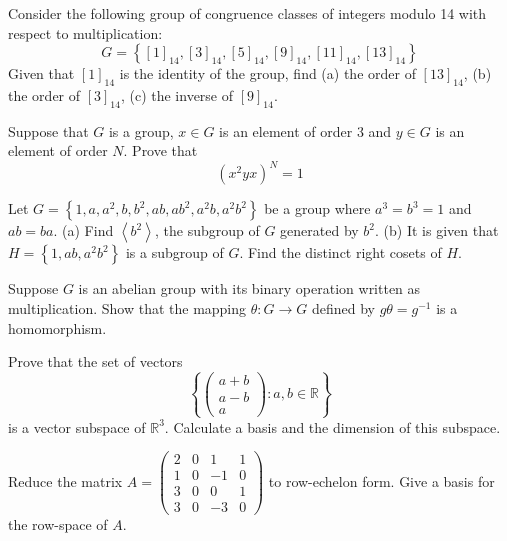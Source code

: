 %
\begin{question}{}{}
	Consider the following group of congruence classes of integers modulo 14 with respect to multiplication:
	$$
	G=\left\{[1]_{14},[3]_{14},[5]_{14},[9]_{14},[11]_{14},[13]_{14}\right\}
	$$
	Given that $[1]_{14}$ is the identity of the group, find
	(a) the order of $[13]_{14}$,
	(b) the order of $[3]_{14}$,
	(c) the inverse of $[9]_{14}$.
\end{question}
%
\begin{question}{}{}
	Suppose that $G$ is a group, $x \in G$ is an element of order 3 and $y \in G$ is an element of order $N$. Prove that
	$$
	\left(x^{2} y x\right)^{N}=1
	$$
\end{question}
%
\begin{question}{}{}
	Let $G=\left\{1, a, a^{2}, b, b^{2}, a b, a b^{2}, a^{2} b, a^{2} b^{2}\right\}$ be a group where $a^{3}=b^{3}=1$ and $a b=b a$.
	(a) Find $\left\langle b^{2}\right\rangle$, the subgroup of $G$ generated by $b^{2}$.
	(b) It is given that $H=\left\{1, a b, a^{2} b^{2}\right\}$ is a subgroup of $G$.
	Find the distinct right cosets of $H$.
\end{question}
%
\begin{question}{}{}
	Suppose $G$ is an abelian group with its binary operation written as multiplication. Show that the mapping $\theta: G \rightarrow G$ defined by $g \theta=g^{-1}$ is a homomorphism.
\end{question}
%
\begin{question}{}{}
	Prove that the set of vectors
	$$
	\left\{\left(\begin{array}{c}
		a+b \\
		a-b \\
		a
	\end{array}\right): a, b \in \mathbb{R}\right\}
	$$
	is a vector subspace of $\mathbb{R}^{3}$.
	Calculate a basis and the dimension of this subspace.
\end{question}
%
\begin{question}{}{}
	Reduce the matrix $A=\left(\begin{array}{rrrr}2 & 0 & 1 & 1 \\ 1 & 0 & -1 & 0 \\ 3 & 0 & 0 & 1 \\ 3 & 0 & -3 & 0\end{array}\right)$ to row-echelon form. Give a basis for the row-space of $A$.
\end{question}
%
